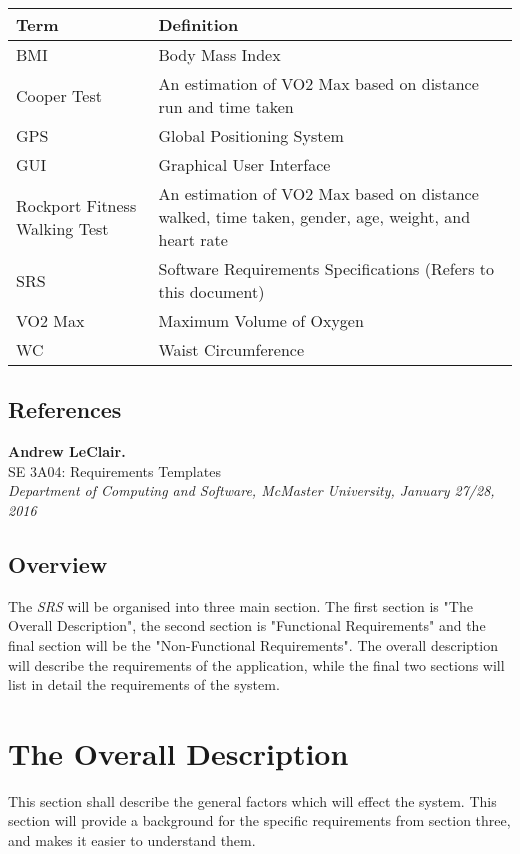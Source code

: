 \documentclass[12pt,letterpaper]{article}
\begin{document}
\begin{center}
\begin{tabularx}{\textwidth}{|l|X|}
\hline
\textbf{Term} & \textbf{Definition}\\ 
\hline
 BMI & Body Mass Index  \\  
\hline
 Cooper Test & An estimation of VO2 Max based on distance run and time taken\\
\hline
 GPS & Global Positioning System \\
\hline
 GUI & Graphical User Interface \\  
\hline
 Rockport Fitness Walking Test & An estimation of VO2 Max based on distance walked, time taken, gender, age, weight, and heart rate\\
\hline
 SRS & Software Requirements Specifications (Refers to this document)  \\  
\hline
 VO2 Max & Maximum Volume of Oxygen \\  
\hline
 WC & Waist Circumference  \\  
\hline


\end{tabularx}
\end{center}

\subsection{References}

\textbf{Andrew LeClair.}\\
SE 3A04: Requirements Templates\\
\textit{Department of Computing and Software, McMaster University, January 27/28, 2016}

\subsection{Overview}
The \textit{SRS} will be organised into three main section. The first section is "The Overall Description", the second section is "Functional Requirements" and the final section will be the "Non-Functional Requirements". The overall description will describe the requirements of the application, while the final two sections will list in detail the requirements of the system.

\section{The Overall Description}
This section shall describe the general factors which will effect the system. This section will provide a background for the specific requirements from section three, and makes it easier to understand them.
\end{document}

